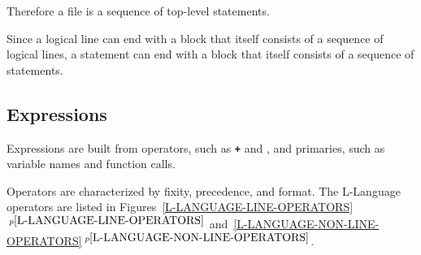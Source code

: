 \documentclass[12pt]{article}
\newcommand{\TT}[1]{{\tt \bfseries #1}}
\newcommand{\itemref}[1]{\ref{#1}$\,^{p\pageref{#1}}$}
\begin{document}
Therefore a file is a sequence of top-level statements.

Since a logical line can end with a block that itself consists
of a sequence of logical lines, a statement can end with
a block that itself consists of a sequence of statements.


\subsection{Expressions}

Expressions are built from operators, such as \TT{+} and \TT{*},
and primaries, such as variable names and function calls.

Operators are characterized by fixity, precedence, and format.
The L-Language operators are listed in
Figures~\itemref{L-LANGUAGE-LINE-OPERATORS}
and~\itemref{L-LANGUAGE-NON-LINE-OPERATORS}.

\newpage
\end{document}

